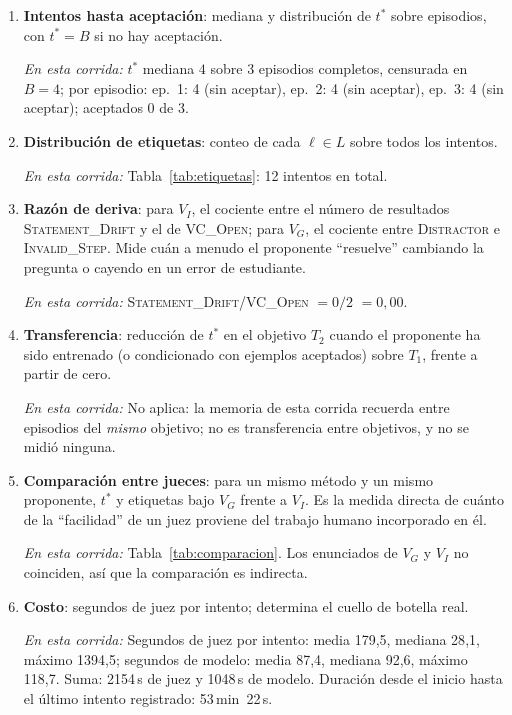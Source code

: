 \documentclass[11pt,a4paper]{article}
\begin{document}
\begin{enumerate}

  \item \textbf{Intentos hasta aceptación}: mediana y distribución de $t^*$ sobre episodios, con $t^* = B$ si no hay aceptación.

  \emph{En esta corrida:} $t^*$ mediana $4$ sobre 3 episodios completos, censurada en $B = 4$; por episodio: ep.~1: 4 (sin aceptar), ep.~2: 4 (sin aceptar), ep.~3: 4 (sin aceptar); aceptados 0 de 3.

  \item \textbf{Distribución de etiquetas}: conteo de cada $\ell \in L$ sobre todos los intentos.

  \emph{En esta corrida:} Tabla~\ref{tab:etiquetas}: 12 intentos en total.

  \item \textbf{Razón de deriva}: para $V_I$, el cociente entre el número de resultados \textsc{Statement\_Drift} y el de \textsc{VC\_Open}; para $V_G$, el cociente entre \textsc{Distractor} e \textsc{Invalid\_Step}. Mide cuán a menudo el proponente ``resuelve'' cambiando la pregunta o cayendo en un error de estudiante.

  \emph{En esta corrida:} \textsc{Statement\_Drift}/\textsc{VC\_Open} $= 0/2$ $= 0{,}00$.

  \item \textbf{Transferencia}: reducción de $t^*$ en el objetivo $T_2$ cuando el proponente ha sido entrenado (o condicionado con ejemplos aceptados) sobre $T_1$, frente a partir de cero.

  \emph{En esta corrida:} No aplica: la memoria de esta corrida recuerda entre episodios del \emph{mismo} objetivo; no es transferencia entre objetivos, y no se midió ninguna.

  \item \textbf{Comparación entre jueces}: para un mismo método y un mismo proponente, $t^*$ y etiquetas bajo $V_G$ frente a $V_I$. Es la medida directa de cuánto de la ``facilidad'' de un juez proviene del trabajo humano incorporado en él.

  \emph{En esta corrida:} Tabla~\ref{tab:comparacion}. Los enunciados de $V_G$ y $V_I$ no coinciden, así que la comparación es indirecta.

  \item \textbf{Costo}: segundos de juez por intento; determina el cuello de botella real.

  \emph{En esta corrida:} Segundos de juez por intento: media 179{,}5, mediana 28{,}1, máximo 1394{,}5; segundos de modelo: media 87{,}4, mediana 92{,}6, máximo 118{,}7. Suma: 2154\,s de juez y 1048\,s de modelo. Duración desde el inicio hasta el último intento registrado: 53\,min~22\,s.

\end{enumerate}
\end{document}
